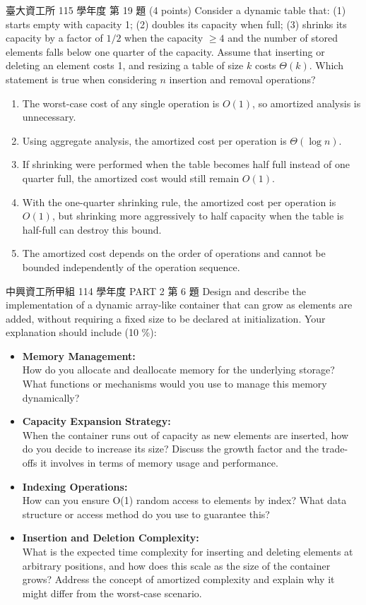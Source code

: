 \begin{pastexam}[label={px:amo-4}]{臺大資工所 115 學年度 第 19 題}
(4 points) Consider a dynamic table that: (1) starts empty with capacity 1; (2) doubles
its capacity when full; (3) shrinks its capacity by a factor of $1/2$ when the capacity
$\ge 4$ and the number of stored elements falls below one quarter of the capacity.
Assume that inserting or deleting an element costs 1, and resizing a table of size $k$
costs $\Theta(k)$. Which statement is true when considering $n$ insertion and removal
operations?
\begin{enumerate}[label=(\Alph*)]
\item The worst-case cost of any single operation is $O(1)$, so amortized analysis is
unnecessary.
\item Using aggregate analysis, the amortized cost per operation is $\Theta(\log n)$.
\item If shrinking were performed when the table becomes half full instead of one
quarter full, the amortized cost would still remain $O(1)$.
\item With the one-quarter shrinking rule, the amortized cost per operation is $O(1)$,
but shrinking more aggressively to half capacity when the table is half-full can destroy
this bound.
\item The amortized cost depends on the order of operations and cannot be bounded
independently of the operation sequence.
\end{enumerate}
\end{pastexam}

\begin{pastexam}[label={px:amo-5}]{中興資工所甲組 114 學年度 PART 2 第 6 題}
Design and describe the implementation of a dynamic array-like container that can grow
as elements are added, without requiring a fixed size to be declared at initialization.
Your explanation should include (10 \%):
\begin{itemize}
\item \textbf{Memory Management:}\\
How do you allocate and deallocate memory for the underlying storage? What functions or
mechanisms would you use to manage this memory dynamically?
\item \textbf{Capacity Expansion Strategy:}\\
When the container runs out of capacity as new elements are inserted, how do you decide
to increase its size? Discuss the growth factor and the trade-offs it involves in terms
of memory usage and performance.
\item \textbf{Indexing Operations:}\\
How can you ensure O(1) random access to elements by index? What data structure or
access method do you use to guarantee this?
\item \textbf{Insertion and Deletion Complexity:}\\
What is the expected time complexity for inserting and deleting elements at arbitrary
positions, and how does this scale as the size of the container grows? Address the
concept of amortized complexity and explain why it might differ from the worst-case
scenario.
\end{itemize}
\end{pastexam}

